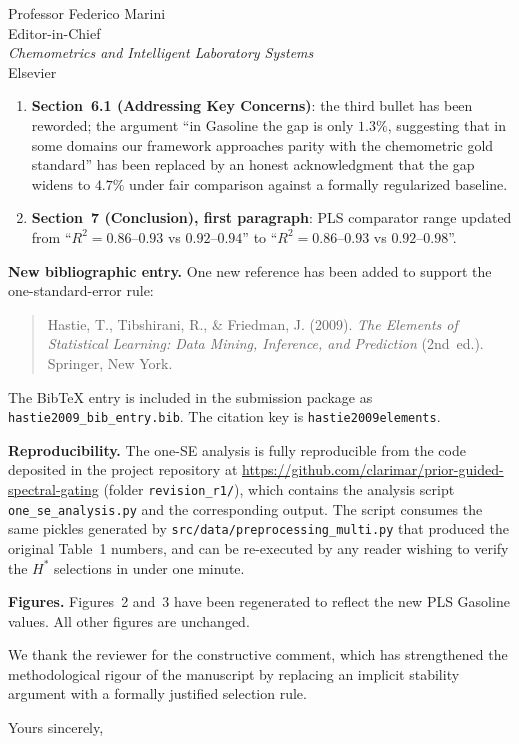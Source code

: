 \documentclass[11pt,a4paper]{letter}
\begin{document}
\begin{letter}{Professor Federico Marini \\
               Editor-in-Chief \\
               \textit{Chemometrics and Intelligent Laboratory Systems} \\
               Elsevier}
\begin{enumerate}
        performance'' descriptor has been updated to
        ``$86$--$95\%$''.
  \item \textbf{Section~6.1 (Addressing Key Concerns)}: the third
        bullet has been reworded; the argument ``in Gasoline the gap is
        only $1.3\%$, suggesting that in some domains our framework
        approaches parity with the chemometric gold standard'' has been
        replaced by an honest acknowledgment that the gap widens to
        $4.7\%$ under fair comparison against a formally regularized
        baseline.
  \item \textbf{Section~7 (Conclusion), first paragraph}: PLS
        comparator range updated from ``$R^2=0.86$--$0.93$ vs
        $0.92$--$0.94$'' to ``$R^2=0.86$--$0.93$ vs $0.92$--$0.98$''.
\end{enumerate}

\medskip
\textbf{New bibliographic entry.}
One new reference has been added to support the one-standard-error rule:

\begin{quote}
Hastie, T., Tibshirani, R., \& Friedman, J. (2009).
\textit{The Elements of Statistical Learning: Data Mining, Inference,
and Prediction} (2nd~ed.). Springer, New York.
\end{quote}

The BibTeX entry is included in the submission package as
\texttt{hastie2009\_bib\_entry.bib}. The citation key is
\texttt{hastie2009elements}.

\medskip
\textbf{Reproducibility.}
The one-SE analysis is fully reproducible from the code deposited in
the project repository at
\url{https://github.com/clarimar/prior-guided-spectral-gating}
(folder \texttt{revision\_r1/}), which contains the analysis script
\texttt{one\_se\_analysis.py} and the corresponding output. The script
consumes the same pickles generated by
\texttt{src/data/preprocessing\_multi.py} that produced the original
Table~1 numbers, and can be re-executed by any reader wishing to verify
the $H^*$ selections in under one minute.

\medskip
\textbf{Figures.}
Figures~2 and~3 have been regenerated to reflect the new PLS Gasoline
values. All other figures are unchanged.

\medskip
We thank the reviewer for the constructive comment, which has
strengthened the methodological rigour of the manuscript by replacing
an implicit stability argument with a formally justified selection rule.

\closing{Yours sincerely,}

\end{letter}
\end{document}
